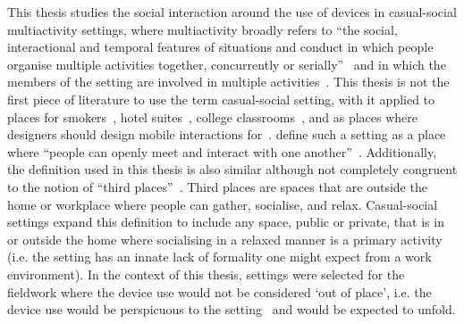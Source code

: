 \begin{revisedsubmission}
This thesis studies the social interaction around the use of devices in casual-social multiactivity settings, where multiactivity broadly refers to ``the social, interactional and temporal features of situations and conduct in which people organise multiple activities together, concurrently or serially''~\citep[p. 5]{Haddington2014} and in which the members of the setting are involved in multiple activities~\citep{Goffman1968}.
\label{line:casualsocial}This thesis is not the first piece of literature to use the term casual-social setting, with it applied to places for smokers~\citep{Schane2009}, hotel suites~\citep{Pigram1996}, college classrooms~\citep[pp. 30--31]{Yamada1981}, and as places where designers should design mobile interactions for~\citep{Reis2012}.
\citet{St.Lawrence1983} define such a setting as a place where ``people can openly meet and interact with one another''~\citep[p. 42]{St.Lawrence1983}.
Additionally, the definition used in this thesis is also similar although not completely congruent to the notion of ``third places''~\citep{Oldenburg1989}.
Third places are spaces that are outside the home or workplace where people can gather, socialise, and relax.
Casual-social settings expand this definition to include any space, public or private, that is in or outside the home where socialising in a relaxed manner is a primary activity (i.e. the setting has an innate lack of formality one might expect from a work environment).
In the context of this thesis, settings were selected for the fieldwork where the device use would not be considered `out of place', i.e. the device use would be perspicuous to the setting~\citep[p. 181]{Garfinkel2002} and would be expected to unfold.
\end{revisedsubmission}


